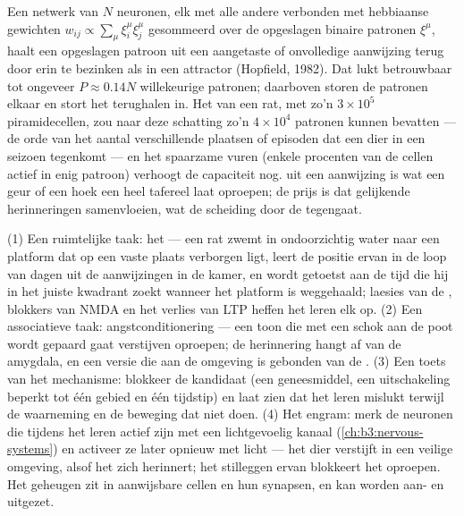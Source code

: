 \begin{proposition}\label{prop:b3:learning-memory:capacity}
Een netwerk van $N$ neuronen, elk met alle andere verbonden met
hebbiaanse gewichten $w_{ij} \propto \sum_{\mu}\xi_{i}^{\mu}\xi_{j}^{\mu}$
gesommeerd over de opgeslagen binaire patronen $\xi^{\mu}$, haalt een
opgeslagen patroon uit een aangetaste of onvolledige aanwijzing terug
door erin te bezinken als in een attractor (Hopfield, 1982). Dat lukt
betrouwbaar tot ongeveer $P
\approx 0.14N$ willekeurige patronen; daarboven storen de patronen
elkaar en stort het terughalen in. Het  van een rat, met zo'n
$3\times 10^{5}$ piramidecellen, zou naar deze schatting zo'n
$4\times 10^{4}$ patronen kunnen bevatten --- de orde van het aantal
verschillende plaatsen of episoden dat een dier in een seizoen
tegenkomt --- en het spaarzame vuren (enkele procenten van de cellen
actief in enig patroon) verhoogt de capaciteit nog. 
uit een aanwijzing is wat een geur of een hoek een heel tafereel laat
oproepen; de prijs is dat gelijkende herinneringen samenvloeien, wat de
scheiding door de  tegengaat.
\end{proposition}
\admitted

\begin{method}\label{met:b3:learning-memory:tests}
(1) Een ruimtelijke taak: het  --- een rat zwemt
in ondoorzichtig water naar een platform dat op een vaste plaats
verborgen ligt, leert de positie ervan in de loop van dagen uit de
aanwijzingen in de kamer, en wordt getoetst aan de tijd die hij in het
juiste kwadrant zoekt wanneer het platform is weggehaald; laesies van
de , blokkers van NMDA en het verlies van LTP heffen het
leren elk op. (2) Een associatieve taak: angstconditionering --- een
toon die met een schok aan de poot wordt gepaard gaat verstijven
oproepen; de herinnering hangt af van de amygdala, en een versie die aan
de omgeving is gebonden van de . (3) Een toets van het
mechanisme: blokkeer de kandidaat (een geneesmiddel, een uitschakeling
beperkt tot één gebied en één tijdstip) en laat zien dat het leren
mislukt terwijl de waarneming en de beweging dat niet doen. (4) Het
engram: merk de neuronen die tijdens het leren actief zijn met een
lichtgevoelig kanaal (\cref{ch:b3:nervous-systems}) en activeer ze
later opnieuw met licht --- het dier verstijft in een veilige omgeving,
alsof het zich herinnert; het stilleggen ervan blokkeert het oproepen.
Het geheugen zit in aanwijsbare cellen en hun synapsen, en kan worden
aan- en uitgezet.
\end{method}

